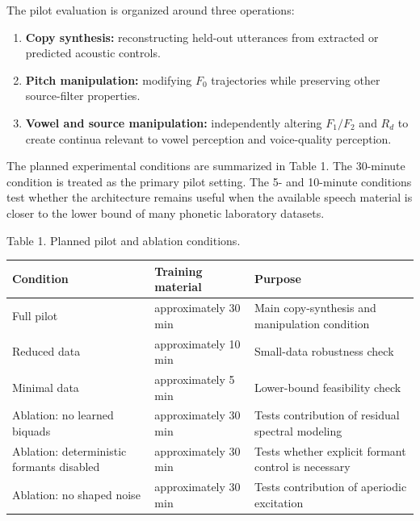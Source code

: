 The pilot evaluation is organized around three operations:

\begin{enumerate}
\def\labelenumi{\arabic{enumi}.}
\tightlist
\item
  \textbf{Copy synthesis:} reconstructing held-out utterances from
  extracted or predicted acoustic controls.
\item
  \textbf{Pitch manipulation:} modifying \(F_0\) trajectories while
  preserving other source-filter properties.
\item
  \textbf{Vowel and source manipulation:} independently altering
  \(F_1/F_2\) and \(R_d\) to create continua relevant to vowel
  perception and voice-quality perception.
\end{enumerate}

The planned experimental conditions are summarized in Table 1. The
30-minute condition is treated as the primary pilot setting. The 5- and
10-minute conditions test whether the architecture remains useful when
the available speech material is closer to the lower bound of many
phonetic laboratory datasets.

Table 1. Planned pilot and ablation conditions.

{\def\LTcaptype{none} %
\begin{longtable}[]{@{}
  >{\raggedright\arraybackslash}p{}
  >{\raggedleft\arraybackslash}p{}
  >{\raggedright\arraybackslash}p{}@{}}
\toprule\noalign{}
\begin{minipage}[b]{\linewidth}\raggedright
Condition
\end{minipage} & \begin{minipage}[b]{\linewidth}\raggedleft
Training material
\end{minipage} & \begin{minipage}[b]{\linewidth}\raggedright
Purpose
\end{minipage} \\
\midrule\noalign{}
\endhead
\bottomrule\noalign{}
\endlastfoot
Full pilot & approximately 30 min & Main copy-synthesis and manipulation
condition \\
Reduced data & approximately 10 min & Small-data robustness check \\
Minimal data & approximately 5 min & Lower-bound feasibility check \\
Ablation: no learned biquads & approximately 30 min & Tests contribution
of residual spectral modeling \\
Ablation: deterministic formants disabled & approximately 30 min & Tests
whether explicit formant control is necessary \\
Ablation: no shaped noise & approximately 30 min & Tests contribution of
aperiodic excitation \\
\end{longtable}
}

